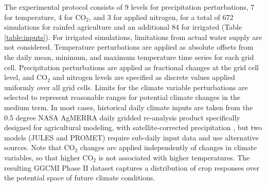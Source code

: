 \documentclass[gmd, manuscript]{copernicus} %
\begin{document}
The experimental protocol consists of 9 levels for precipitation perturbations, 7 for temperature, 4 for CO$_2$, and 3 for applied nitrogen, for a total of 672 simulations for rainfed agriculture and an additional 84 for irrigated (Table \ref{table:inputs}). For irrigated simulations, limitations from actual water supply are not considered. Temperature perturbations are applied as absolute offsets from the daily mean, minimum, and maximum temperature time series for each grid cell. Precipitation perturbations are applied as fractional changes at the grid cell level, and CO$_2$ and nitrogen levels are specified as discrete values applied uniformly over all grid cells. Limits for the climate variable perturbations are selected to represent reasonable ranges for potential climate changes in the medium term. In most cases, historical daily climate inputs are taken from the 0.5 degree NASA AgMERRA daily gridded re-analysis product specifically designed for agricultural modeling, with satellite-corrected precipitation \citep{Ruane2015}, but two models (JULES and PROMET) require sub-daily input data and use alternative sources. Note that CO$_2$ changes are applied independently of changes in climate variables, so that higher CO$_2$ is not associated with higher temperatures. The resulting GGCMI Phase II dataset captures a distribution of crop responses over the potential space of future climate conditions.

\end{document}
